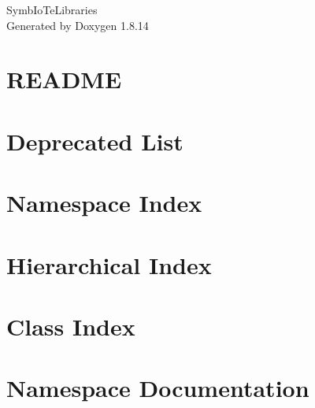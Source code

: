 \documentclass[twoside]{book}
\newcommand{\+}{\discretionary{\mbox{\scriptsize$\hookleftarrow$}}{}{}}
\newcommand{\clearemptydoublepage}{%
  \newpage{\pagestyle{empty}\cleardoublepage}%
}
\begin{document}
\hypersetup{pageanchor=false,
             bookmarksnumbered=true,
             pdfencoding=unicode
            }
\begin{titlepage}
\vspace*{7cm}
\begin{center}%
{\Large Symb\+Io\+Te\+Libraries }\\
\vspace*{1cm}
{\large Generated by Doxygen 1.8.14}\\
\end{center}
\end{titlepage}
\clearemptydoublepage
{}
\tableofcontents
\clearemptydoublepage
{}
\hypersetup{pageanchor=true}

\chapter{R\+E\+A\+D\+ME}
\label{md_README}

\chapter{Deprecated List}
\label{deprecated}

\chapter{Namespace Index}

\chapter{Hierarchical Index}

\chapter{Class Index}

\chapter{Namespace Documentation}

\end{document}
